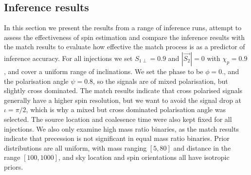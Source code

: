 \documentclass[11pt]{article}
\begin{document}
\subsection{Inference results}
In this section we present the results from a range of inference runs, attempt to assess the effectiveness of spin estimation and compare the inference results with the match results to evaluate how effective the match process is as a predictor of inference accuracy. For all injections we set $S_{1\perp}=0.9$ and $|\vec{S_2}|=0$ with $\chi_p=0.9$, and cover a uniform range of inclinations. We set the phase to be $\phi=0.$, and the polarisation angle $\psi=0.8$, so the signals are of mixed polarisation, but slightly cross dominated. The match results indicate that cross polarised signals generally have a higher spin resolution, but we want to avoid the signal drop at $\iota=\pi/2$, which is why a mixed but cross dominated polarisation angle was selected. The source location and coalesence time were also kept fixed for all injections. We also only examine high mass ratio binaries, as the match results indicate that precession is not significant in equal mass ratio binaries. Prior distributions are all uniform, with mass ranging $[5,80]$ and distance in the range $[100,1000]$, and sky location and spin orientations all have isotropic priors.
\end{document}
